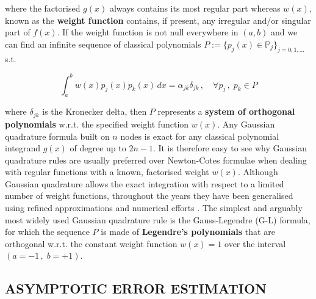 \documentclass[a4paper, twosided]{book}
\begin{document}
\noindent
where the factorised $g(x)$ always contains its most regular part whereas $w(x)$, known as the \color{poliDarkBlue} \textbf{weight function} \color{black} contains, if present, any irregular and/or singular part of $f(x)$. If the weight function is not null everywhere in $(a,b)$ and we can find an infinite sequence of classical polynomials $P:=\big\{p_j(x)\in\mathbb{P}_j\big\}_{j=0,1,...}$ s.t.

\begin{equation}\label{eq1.6}
    \int_a^b w(x)p_j(x)p_k(x)\,dx = \alpha_{jk}\delta_{jk}\,,\quad\forall p_j\,,\;p_k\in P
\end{equation}

\noindent
where $\delta_{jk}$ is the Kronecker delta, then $P$ represents a \color{poliDarkBlue} \textbf{system of orthogonal polynomials} \color{black} w.r.t. the specified weight function $w(x)$. Any Gaussian quadrature formula built on  $n$ nodes is exact for any classical polynomial integrand $g(x)$ of degree up to $2n-1$. It is therefore easy to see why Gaussian quadrature rules are usually preferred over Newton-Cotes formulae when dealing with regular functions with a known, factorised weight $w(x)$. Although Gaussian quadrature allows the exact integration with respect to a limited number of weight functions, throughout the years they have been generalised using refined approximations and numerical efforts \cite{Gautschi94}. The simplest and arguably most widely used Gaussian quadrature rule is the Gauss-Legendre (G-L) formula, for which the sequence $P$ is made of \color{poliDarkBlue} \textbf{Legendre's polynomials} \color{black} that are orthogonal w.r.t. the constant weight function $w(x)=1$ over the interval $(a=-1\,,\;b=+1)$.

\subsection[Asymptotic error estimation]{\changefont ASYMPTOTIC ERROR ESTIMATION \color{black}}\label{SubSec1.2.3}
\end{document}
